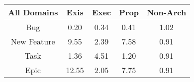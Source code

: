 \begin{tabular}{|c||c|c|c|c|}
\hline
All Domains & Exis & Exec & Prop & Non-Arch \\ 
\hline
Bug & \cellcolor[rgb]{0.76,0.13,0.28} 0.20 & \cellcolor[rgb]{0.7864749455085729,0.2553147420739113,0.30470994914133465} 0.34 & \cellcolor[rgb]{0.7998929747327642,0.31882674706841724,0.31723344308391327} 0.41 & \cellcolor[rgb]{0.9093174453178609,0.8396766846242498,0.42} 1.02 \\ 
\hline
New Feature & \cellcolor[rgb]{0.6287476323177197,0.706775194255762,0.42} 9.55 & \cellcolor[rgb]{0.864301065527789,0.8183531363026368,0.42} 2.39 & \cellcolor[rgb]{0.6936362060114851,0.7375118870580719,0.42} 7.58 & \cellcolor[rgb]{0.8933346768063051,0.7611174702165104,0.40444569835255134} 0.91 \\ 
\hline
Task & \cellcolor[rgb]{0.8982191809582263,0.8344196120328439,0.42} 1.36 & \cellcolor[rgb]{0.7944726408544087,0.7852765140889304,0.42} 4.51 & \cellcolor[rgb]{0.9035005731503661,0.8369213241238576,0.42} 1.20 & \cellcolor[rgb]{0.8939487033736696,0.7640238626353693,0.40501878981542494} 0.91 \\ 
\hline
Epic & \cellcolor[rgb]{0.53,0.66,0.42} 12.55 & \cellcolor[rgb]{0.8754622677873768,0.8236400215834944,0.42000000000000004} 2.05 & \cellcolor[rgb]{0.6879826740906776,0.7348338982534789,0.42} 7.75 & \cellcolor[rgb]{0.892275914260257,0.7561059941652163,0.40345751997623985} 0.91 \\ 
\hline
\end{tabular}